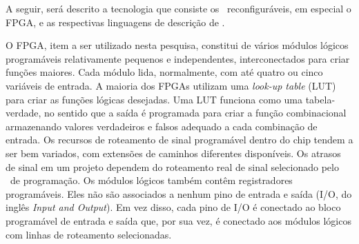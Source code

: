 	A seguir, será descrito a tecnologia que consiste os \hardwares\ reconfiguráveis, em especial o FPGA, e as respectivas linguagens de descrição de \hardware.


   O FPGA, item a ser utilizado nesta pesquisa, constitui de vários módulos lógicos programáveis relativamente pequenos e independentes, interconectados para criar funções maiores.
   Cada módulo lida, normalmente, com até quatro ou cinco variáveis de entrada.
   A maioria dos FPGAs utilizam uma \textit{look-up table} (LUT) para criar as funções lógicas desejadas.
   Uma LUT funciona como uma tabela-verdade, no sentido que a saída é programada para criar a função combinacional armazenando valores verdadeiros e falsos adequado a cada combinação de entrada.
   Os recursos de roteamento de sinal programável dentro do chip tendem a ser bem variados, com extensões de caminhos diferentes disponíveis.
   Os atrasos de sinal em um projeto dependem do roteamento real de sinal selecionado pelo \software\ de programação.
   Os módulos lógicos também contêm registradores programáveis.
   Eles não são associados a nenhum pino de entrada e saída (I/O, do inglês \textit{Input and Output}).
   Em vez disso, cada pino de I/O é conectado ao bloco programável de entrada e saída que, por sua vez, é conectado aos módulos lógicos com linhas de roteamento selecionadas.

